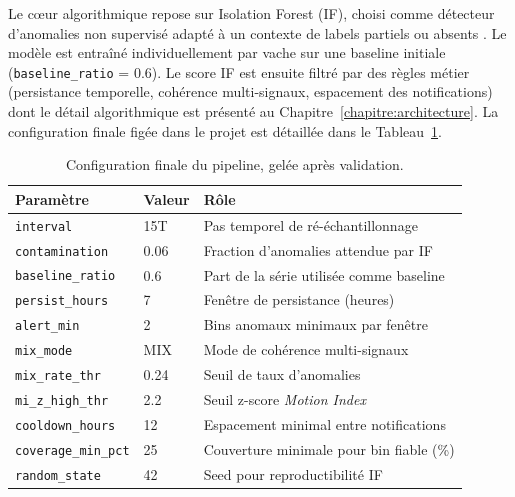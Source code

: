 Le cœur algorithmique repose sur Isolation Forest (IF), choisi comme détecteur
d'anomalies non supervisé adapté à un contexte de labels partiels ou absents
\citep{liu2008isolation}. Le modèle est entraîné individuellement par vache sur une
baseline initiale (\texttt{baseline\_ratio} = 0.6). Le score IF est ensuite filtré par
des règles métier (persistance temporelle, cohérence multi-signaux, espacement des
notifications) dont le détail algorithmique est présenté au
Chapitre~\ref{chapitre:architecture}. La configuration finale figée dans le projet
est détaillée dans le Tableau~\ref{tab:config_finale}.

\begin{table}[H]
    \centering
    \caption{Configuration finale du pipeline, gelée après validation.}
    \label{tab:config_finale}
    \begin{tabular}{llp{6.5cm}}
        \toprule
        \textbf{Paramètre}           & \textbf{Valeur} & \textbf{Rôle} \\
        \midrule
        \texttt{interval}            & 15T             & Pas temporel de ré-échantillonnage \\
        \texttt{contamination}       & 0.06            & Fraction d'anomalies attendue par IF \\
        \texttt{baseline\_ratio}     & 0.6             & Part de la série utilisée comme baseline \\
        \texttt{persist\_hours}      & 7               & Fenêtre de persistance (heures) \\
        \texttt{alert\_min}          & 2               & Bins anomaux minimaux par fenêtre \\
        \texttt{mix\_mode}           & MIX             & Mode de cohérence multi-signaux \\
        \texttt{mix\_rate\_thr}      & 0.24            & Seuil de taux d'anomalies \\
        \texttt{mi\_z\_high\_thr}    & 2.2             & Seuil z-score \textit{Motion Index} \\
        \texttt{cooldown\_hours}     & 12              & Espacement minimal entre notifications \\
        \texttt{coverage\_min\_pct}  & 25              & Couverture minimale pour bin fiable (\%) \\
        \texttt{random\_state}       & 42              & Seed pour reproductibilité IF \\
        \bottomrule
    \end{tabular}
\end{table}


